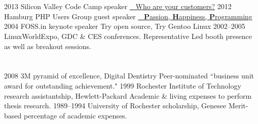 \documentclass[]{friggeri-cv} %
\begin{document}
\section{{} {} {\normalsize {}}}

\begin{entrylist}
\entry
{2013}
{Silicon Valley Code Camp}
{speaker}
{\href{http://www.siliconvalley-codecamp.com/Session/2013/who-are-your-customers}{{\tiny \color{LightGray}} ~ Who are your customers?}}
\entry
{2012}
{Hamburg PHP Users Group}
{guest speaker}
{\href{https://speakerdeck.com/seemantk/developing-with-passion}{{\tiny \color{LightGray}} ~  \textbf{P}assion, \textbf{H}appiness, \textbf{P}rogramming}}
\entry
{2004}
{FOSS.in}
{keynote speaker}
{Try open source, Try Gentoo Linux}
\entry
{2002--2005}
{LinuxWorldExpo, GDC \& CES conferences.}
{Representative}
{Led booth presence as well as breakout sessions.}
\end{entrylist}


\section{{} {} {\normalsize {}}}

\begin{entrylist}
\entry
{2008}
{3M}
{pyramid of excellence, Digital Dentistry}
{Peer-nominated ``business unit award for outstanding achievement."}
\entry
{1999}
{Rochester Institute of Technology}
{research assistantship, Hewlett-Packard}
{Academic \& living expenses to perform thesis research.}
\entry
{1989--1994}
{University of Rochester}
{scholarship, Genesee}
{Merit-based percentage of academic expenses.}
\end{entrylist}
\end{document}

